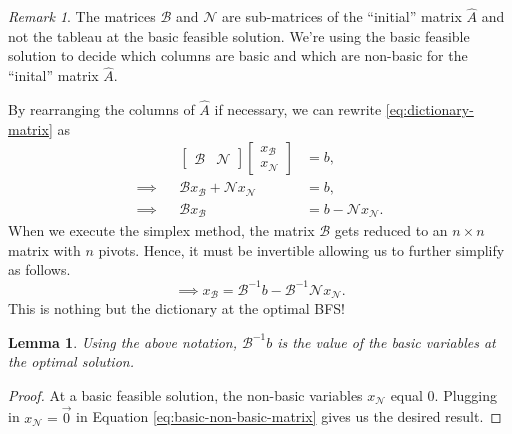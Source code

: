 \documentclass[
]{book}
\newtheorem{lemma}{Lemma}[chapter]
\theoremstyle{definition}
\theoremstyle{definition}
\theoremstyle{definition}
\theoremstyle{definition}
\theoremstyle{remark}
\newtheorem*{remark}{Remark}
\begin{document}
\begin{remark}
The matrices \(\mathcal{B}\) and \(\mathcal{N}\) are sub-matrices of the ``initial'' matrix \(\widehat{A}\)
and not the tableau at the basic feasible solution. We're using the basic feasible solution to
decide which columns are basic and which are non-basic for the ``inital'' matrix \(\widehat{A}\).
\end{remark}

By rearranging the columns of \(\widehat{A}\) if necessary, we can rewrite \eqref{eq:dictionary-matrix} as
\begin{align*}
  && 
    \begin{bmatrix} \mathcal{B} & \mathcal{N} \end{bmatrix}
    \begin{bmatrix} x_{\mathcal{B}} \\ x_{\mathcal{N}} \end{bmatrix}
      &= b,\\
  \implies 
  &&
    \mathcal{B} x_{\mathcal{B}} + \mathcal{N} x_{\mathcal{N}} &= b, \\
  \implies
  &&
    \mathcal{B} x_{\mathcal{B}} &= b -  \mathcal{N} x_{\mathcal{N}}.
\end{align*}
When we execute the simplex method, the matrix \(\mathcal{B}\) gets reduced to an \(n \times n\) matrix
with \(n\) pivots. Hence, it must be invertible allowing us to further simplify as follows.
\begin{equation}
  \implies x_{\mathcal{B}} = \mathcal{B}^{-1} b - \mathcal{B}^{-1} \mathcal{N} x_{\mathcal{N}}.
  \label{eq:basic-non-basic-matrix}
\end{equation}
This is nothing but the dictionary at the optimal BFS!

\begin{lemma}
\protect\hypertarget{lem:basic-values}{}\label{lem:basic-values}Using the above notation, \(\mathcal{B}^{-1}b\) is the value of the basic variables at the optimal solution.
\end{lemma}

\begin{proof}
At a basic feasible solution, the non-basic variables \(x_{\mathcal{N}}\) equal 0. Plugging in
\(x_{\mathcal{N}} = \vec{0}\) in Equation \eqref{eq:basic-non-basic-matrix} gives us the desired
result.
\end{proof}
\end{document}
